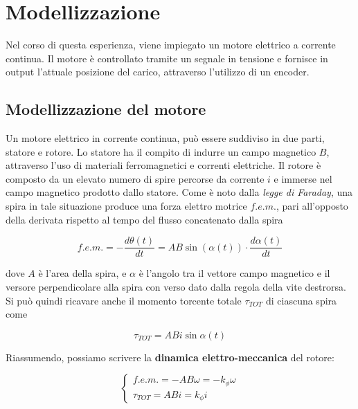 \section{Modellizzazione}
\label{sec:Modelizzazione}
	
	Nel corso di questa esperienza, viene impiegato un motore elettrico a corrente continua. Il motore è controllato tramite un segnale in tensione e fornisce in output l'attuale posizione del carico, attraverso l'utilizzo di un encoder.
	
	\subsection{Modellizzazione del motore}
	\label{subsec:ModellizzazioneMotore}
	
		Un motore elettrico in corrente continua, può essere suddiviso in due parti, statore e rotore. \newline
		Lo statore ha il compito di indurre un campo magnetico $B$, attraverso l'uso di materiali ferromagnetici e correnti elettriche. \newline
		Il rotore è composto da un elevato numero di spire percorse da corrente $i$ e immerse nel campo magnetico prodotto dallo statore. \newline
		Come è noto dalla \textit{legge di Faraday}, una spira in tale situazione produce una forza elettro motrice $f.e.m.$, pari all'opposto della derivata rispetto al tempo del flusso concatenato dalla spira
	
		\begin{equation}
			f.e.m. = -\frac{d\theta(t)}{dt} = AB\sin(\alpha(t))\cdot\frac{d\alpha(t)}{dt}
			\label{eq:fem}
		\end{equation}
	
		\noindent dove $A$ è l'area della spira, e $\alpha$ è l'angolo tra il vettore campo magnetico e il versore perpendicolare alla spira con verso dato dalla regola della vite destrorsa. \newline
		Si può quindi ricavare anche il momento torcente totale $\tau_{TOT}$ di ciascuna spira come
	
		\begin{equation}
			\tau_{TOT} = ABi\sin{\alpha(t)}
			\label{eq:momentoTorcente}
		\end{equation} 
	
		\noindent Riassumendo, possiamo scrivere la \textbf{dinamica elettro-meccanica} del rotore:
		
		\begin{equation}
			\begin{cases}
				f.e.m. = -AB\omega = -k_{\phi}\omega \\
				\tau_{TOT} = ABi = k_{\phi}i
			\end{cases}
			\label{eq:dinamecaElettroMeccanica}
		\end{equation}
	

